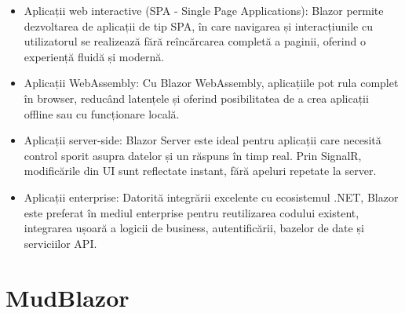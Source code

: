 \begin{itemize}
    \item Aplicații web interactive (SPA - Single Page Applications): Blazor permite dezvoltarea de aplicații de tip SPA, în care navigarea și interacțiunile cu utilizatorul se realizează fără reîncărcarea completă a paginii, oferind o experiență fluidă și modernă.
    \item Aplicații WebAssembly: Cu Blazor WebAssembly, aplicațiile pot rula complet în browser, reducând latențele și oferind posibilitatea de a crea aplicații offline sau cu funcționare locală.
    \item Aplicații server-side: Blazor Server este ideal pentru aplicații care necesită control sporit asupra datelor și un răspuns în timp real. Prin SignalR, modificările din UI sunt reflectate instant, fără apeluri repetate la server.
    \item Aplicații enterprise: Datorită integrării excelente cu ecosistemul .NET, Blazor este preferat în mediul enterprise pentru reutilizarea codului existent, integrarea ușoară a logicii de business, autentificării, bazelor de date și serviciilor API.
\end{itemize}\parencite{blazor}

\section{MudBlazor}
